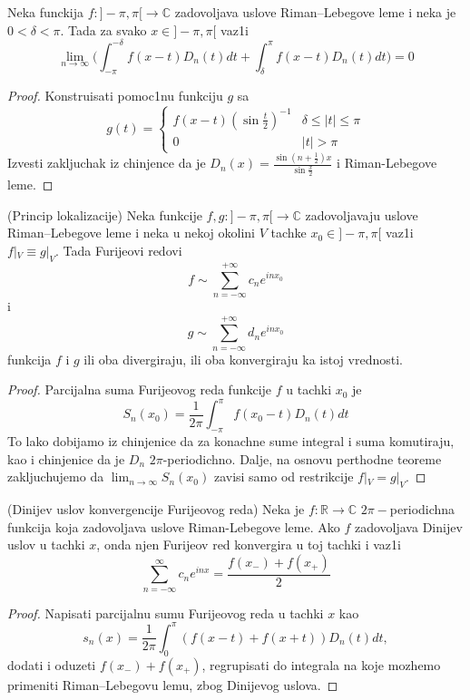 \documentclass[a4paper,12pt]{article}
\newcommand{\RR}{\mathbb{R}}
\newcommand{\CC}{\mathbb{C}}
\begin{document}
\begin{tma}
Neka funckija $f:]-\pi, \pi[ \to \CC$ zadovoljava uslove Riman--Lebegove leme i neka je $0 < \delta < \pi$. Tada za svako $x \in ]-\pi, \pi[$ vaz1i
\[\lim_{n \to \infty}\big(\int_{-\pi}^{-\delta}f(x-t)D_n(t) dt + \int_\delta^\pi f(x-t)D_n(t)dt\big) = 0\]
\end{tma}
\begin{proof}
Konstruisati pomoc1nu funkciju $g$ sa
\[
g(t) = \begin{cases}
  f(x-t) {(\sin \frac{t}{2})}^{-1}  & \delta \leq |t| \leq \pi \\
  0 & |t|>\pi
\end{cases}
\]
Izvesti zakljuchak iz chinjence da je $D_n(x) = \frac{\sin(n + \frac{1}{2})x}{\sin \frac{x}{2}}$ i Riman-Lebegove leme.
\end{proof}
\begin{posl}(Princip lokalizacije) Neka funkcije $f,g:]-\pi, \pi[ \to \CC$ zadovoljavaju uslove Riman--Lebegove leme i neka u nekoj okolini $V$ tachke $x_0 \in ]-\pi, \pi[$ vaz1i $f|_V \equiv g|_V$. Tada Furijeovi redovi 
\[f \sim \sum_{n = - \infty}^{+ \infty} c_n e^{inx_0}\]
i
\[g \sim \sum_{n = -\infty}^{+ \infty} d_n e^{inx_0} \]
funkcija $f$ i $g$ ili oba divergiraju, ili oba konvergiraju ka istoj vrednosti.
\end{posl}
\begin{proof}
Parcijalna suma Furijeovog reda funkcije $f$ u tachki $x_0$ je
\[S_n(x_0) = \frac{1}{2\pi} \int_{-\pi}^{\pi}f(x_0 - t) D_n(t) dt\]
To lako dobijamo iz chinjenice da za konachne sume integral i suma komutiraju, kao i chinjenice da je $D_n$ $2 \pi$-periodichno. Dalje, na osnovu perthodne teoreme zakljuchujemo da $\lim_{n\to \infty} S_n(x_0)$ zavisi samo od restrikcije $f|_V = g|_V$.
\end{proof}

\begin{tma}(Dinijev uslov konvergencije Furijeovog reda)
Neka je $f: \RR \to \CC$ $2 \pi-$periodi\-chna funkcija koja zadovoljava uslove Riman-Lebegove leme. Ako $f$ zadovoljava Dinijev uslov u tachki $x$, onda njen Furijeov red konvergira u toj tachki i vaz1i
\[\sum_{n = - \infty}^{\infty} c_n e^{inx} = \frac{f(x_-) + f(x_+)}{2}\]
\end{tma}
\begin{proof}
	Napisati parcijalnu sumu Furijeovog reda u tachki $x$ kao
	\[ s_n(x) = \frac{1}{2\pi}\int_0^\pi (f(x-t) + f(x+t)) D_n(t) dt ,\] 
	dodati i oduzeti $f(x_-) + f(x_+)$, regrupisati do integrala na koje mozhemo primeniti Riman--Lebegovu lemu, zbog Dinijevog uslova.
\end{proof}
\end{document}
